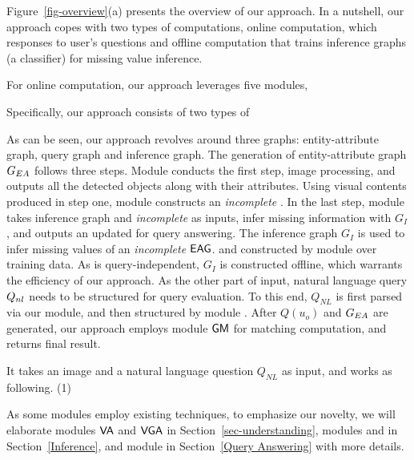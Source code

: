 
Figure~\ref{fig-overview}(a) presents the overview of our approach. In a nutshell, our approach copes with two types of computations, \ie online computation, which responses to user's questions and offline computation that trains inference graphs (\ie a classifier) for missing value inference. 

For online computation, our approach leverages five modules, \ie 


Specifically, our approach consists of two types of 

As can be seen, our approach revolves around three graphs: entity-attribute graph, query graph and inference graph. The generation of entity-attribute graph $G_{EA}$ follows three steps. Module  conducts the first step, \ie image processing, and outputs all the detected objects along with their attributes. Using visual contents produced in step one, module  constructs an {\em incomplete} . In the last step, module  takes inference graph and {\em incomplete}  as inputs, infer missing information with $G_I$, and outputs an updated  for query answering. 
The inference graph $G_I$ is used to infer missing values of an {\em incomplete} ${\mathsf{EAG}}$. %
and constructed by module  over training data. As is query-independent, $G_I$ is constructed offline, which warrants the efficiency of our approach. %
As the other part of input, natural language query $Q_{nl}$ needs to be structured for query evaluation. To this end, $Q_{NL}$ is first parsed via our  module, and then structured by module . After $Q(u_o)$ and $G_{EA}$ are generated, our approach employs module ${\mathsf{GM}}$ for matching computation, and returns final result.  %


It takes an image and a natural language question $Q_{NL}$ as input, and works as following. (1)


As some modules employ existing techniques, to emphasize our novelty, we will elaborate modules ${\mathsf{VA}}$ and ${\mathsf{VGA}}$ in Section~\ref{sec-understanding}, modules  and  in Section~\ref{Inference}, and module  in Section~\ref{Query Answering} with more details. 